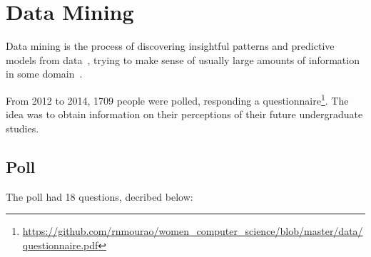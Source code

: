 \section{Data Mining}\label{sec:mining}%

Data mining is the process of discovering insightful patterns and predictive models from data~\cite{Zaki2014}, trying to make sense of usually large amounts of information in some domain~\cite{Cios2007}. 

From 2012 to 2014, 1709 people were polled, responding a questionnaire\footnote{\url{https://github.com/rnmourao/women\_computer\_science/blob/master/data/questionnaire.pdf}}. The idea was to obtain information on their perceptions of their future undergraduate studies.

\subsection{Poll}\label{sec:mining:poll}%
The poll had 18 questions, decribed below:

